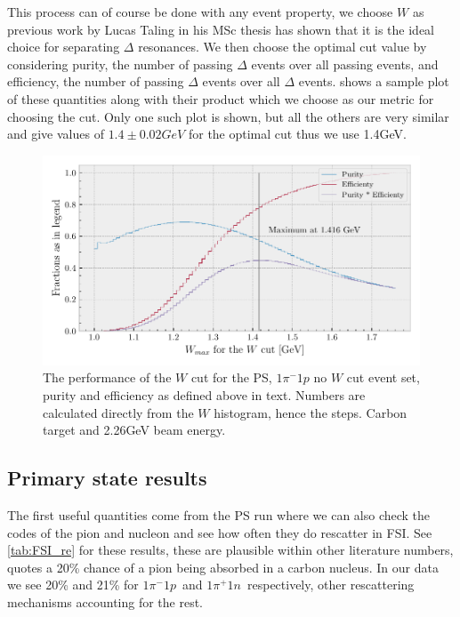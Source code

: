 \documentclass[a4paper,12pt]{article}
\newcommand{\verbb}[1]{\text{\Verb|#1|}}
\newcommand{\md}{$1\pi^-1p$}
\newcommand{\pd}{$1\pi^+1n$}
\begin{document}
This process can of course be done with any event property, we choose $W$ as previous work by Lucas Taling in his MSc thesis has shown that it is the ideal choice for separating $\Delta$ resonances.
We then choose the optimal cut value by considering purity, the number of passing $\Delta$ events over all passing events, and efficiency, the number of passing $\Delta$ events over all $\Delta$ events.
 shows a sample plot of these quantities along with their product which we choose as our metric for choosing the cut.
Only one such plot is shown, but all the others are very similar and give values of $1.4 \pm 0.02 \si{GeV}$ for the optimal cut thus we use 1.4\si{GeV}.

\begin{figure}[H]
    \centering
    \includegraphics{figures/python/W_cut_metr.pdf}
    \caption{
        The performance of the $W$ cut for the PS, $1\pi^-1p$ no $W$ cut event set, purity and efficiency as defined above in text.
        Numbers are calculated directly from the $W$ histogram, hence the steps.
        Carbon target and 2.26\si{GeV} beam energy.
    }\label{fig:W_cut_metr}
\end{figure}

\subsection{Primary state results}
The first useful quantities come from the PS run where we can also check the \verbb{resc} codes of the pion and nucleon and see how often they do rescatter in FSI.
See \cref{tab:FSI_re} for these results, these are plausible within other literature numbers, \cite{stevendytmanFinalStateInteractions2009} quotes a 20\% chance of a pion being absorbed in a carbon nucleus.
In our data we see 20\% and 21\% for \md\ and \pd\ respectively, other rescattering mechanisms accounting for the rest.
\end{document}
